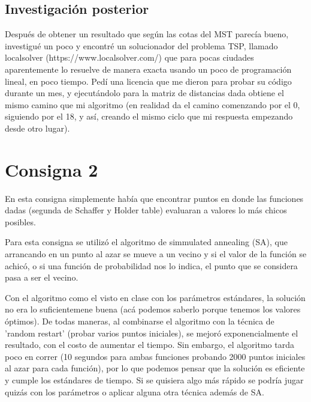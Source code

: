 \documentclass{article}
\begin{document}
\subsection{Investigación posterior}
Después de obtener un resultado que según las cotas del MST parecía bueno, investigué un poco y encontré un solucionador del problema TSP, llamado localsolver (https://www.localsolver.com/) que para pocas ciudades aparentemente lo resuelve de manera exacta usando un poco de programación lineal, en poco tiempo. Pedí una licencia que me dieron para probar su código durante un mes, y ejecutándolo para la matriz de distancias dada obtiene el mismo camino que mi algoritmo (en realidad da el camino comenzando por el 0, siguiendo por el 18, y así, creando el mismo ciclo que mi respuesta empezando desde otro lugar).
\\

\section{Consigna 2}

En esta consigna simplemente había que encontrar puntos en donde las funciones dadas (segunda de Schaffer y Holder table) evaluaran a valores lo más chicos posibles.

Para esta consigna se utilizó el algoritmo de simmulated annealing (SA), que arrancando en un punto al azar se mueve a un vecino y si el valor de la función se achicó, o si una función de probabilidad nos lo indica, el punto que se considera pasa a ser el vecino.

Con el algoritmo como el visto en clase con los parámetros estándares, la solución no era lo suficientemene buena (acá podemos saberlo porque tenemos los valores óptimos).
De todas maneras, al combinarse el algoritmo con la técnica de 'random restart' (probar varios puntos iniciales), se mejoró exponencialmente el resultado, con el costo de aumentar el tiempo. Sin embargo, el algoritmo tarda poco en correr (10 segundos para ambas funciones probando 2000 puntos iniciales al azar para cada función), por lo que podemos pensar que la solución es eficiente y cumple los estándares de tiempo. Si se quisiera algo más rápido se podría jugar quizás con los parámetros o aplicar alguna otra técnica además de SA.
\end{document}
